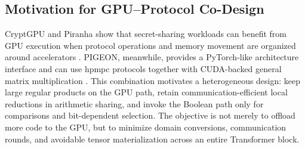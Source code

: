 \subsection{Motivation for GPU--Protocol Co-Design}
CryptGPU and Piranha show that secret-sharing workloads can benefit from GPU execution when protocol operations and memory movement are organized around accelerators \cite{tan2021cryptgpu,watson2022piranha}. PIGEON, meanwhile, provides a PyTorch-like architecture interface and can use hpmpc protocols together with CUDA-backed general matrix multiplication \cite{harth2025pigeon}. This combination motivates a heterogeneous design: keep large regular products on the GPU path, retain communication-efficient local reductions in arithmetic sharing, and invoke the Boolean path only for comparisons and bit-dependent selection. The objective is not merely to offload more code to the GPU, but to minimize domain conversions, communication rounds, and avoidable tensor materialization across an entire Transformer block.
